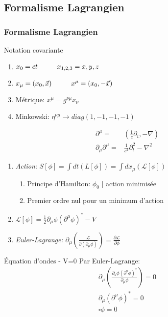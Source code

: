 \documentclass[handout]{beamer}
\begin{document}
\subsection{Formalisme Lagrangien}
\begin{frame}

\frametitle{Formalisme Lagrangien}

\begin{block}{Notation covariante}

\begin{enumerate}
\item $x_0 = ct \hspace{1 cm} x_{1,2,3} = x,y,z$
\item $x_\mu = (x_0,\vec{x}) \hspace{1 cm} x^\mu = (x_0,-\vec{x})$
\item Métrique: $x^\mu = g^{\nu\mu} x_\nu$
\item Minkowski: $\eta^{\nu\mu} \rightarrow diag(1,-1,-1,-1)$
\end{enumerate}

\end{block}
\begin{align*}
\partial^\mu =& (\frac{1}{c} \partial_t, -\nabla) \\
\partial_\mu \partial^\mu =& \frac{1}{c^2} \partial_t^2- \nabla^2
\end{align*}
\end{frame}

\begin{frame}
\begin{enumerate}
\item \textit{Action}: $S[\phi] = \int{dt (L[\phi])}  =  \int{dx_\mu (\mathcal{L}[\phi])}$
\begin{enumerate}
\item Principe d'Hamilton: $\phi_0$ | action minimisée \\
\item Premier ordre nul pour un minimum d'action \\
\end{enumerate}
\item  $\mathcal{L}[\phi] = \frac{1}{2} \partial_\mu \phi (\partial^\mu \phi)^* -V$
\item \textit{Euler-Lagrange:} $\partial_\mu \left(\frac{\mathcal{L}}{\partial(\partial_\mu\phi)}\right) = \frac{\partial\mathcal{L}}{\partial\phi}$
\end{enumerate}
\begin{exampleblock}{Équation d'ondes - V=0}
Par Euler-Lagrange:
\begin{align*}
 \partial_\mu(\frac{\partial_a\phi (\partial^a\phi)^* }{\partial_\mu \phi}) = 0 \\
\partial_\mu (\partial^\mu \phi)^*  = 0 \\
 \square \phi = 0 \\
\end{align*}

\end{exampleblock}

\end{frame}
\end{document}
